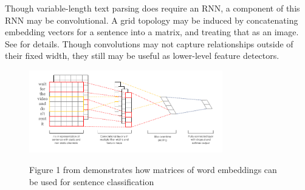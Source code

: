 \documentclass{article}
\begin{document}
Though variable-length text parsing does require an RNN, a component of this RNN may be convolutional. A grid topology may be induced by concatenating embedding vectors for a sentence into a matrix, and treating that as an image. See  for details. Though convolutions may not capture relationships outside of their fixed width, they still may be useful as lower-level feature detectors.
\begin{figure}[!h]
\centering
{\includegraphics[width=0.75\textwidth]{kim2014.pdf}}
  \caption{Figure 1 from  demonstrates how matrices of word embeddings can be used for sentence classification}
\label{fig:serial}
\end{figure}
\end{document}
